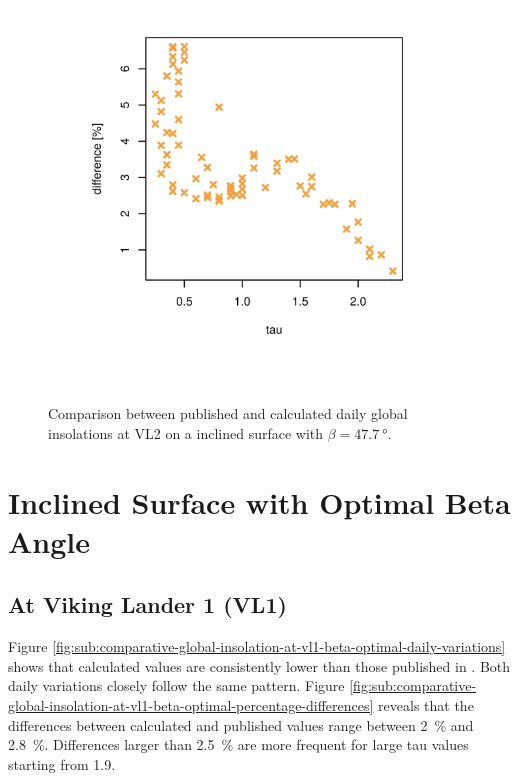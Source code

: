 \begin{figure}[H]
\begin{subfigure}[t]{\subfigureWidth}
            \includegraphics[height=\graphicsHeight]{sections/appendix/insolation-calculation-verification/plots/h-diff-bet-exp-calc-at-vl2-with-beta-477-deg.png}
            \label{fig:sub:comparative-global-insolation-at-vl2-beta-equals-phi-percentage-differences}
    \end{subfigure}\\[0.8ex]
    \caption{Comparison between published and calculated daily global insolations at \ac{VL2} on a inclined surface with $\beta=\SI{47.7}{\degree}$.}
    \label{fig:plot:comparative-global-insolation-at-vl2-beta-equals-phi}
\vspace{-2ex}
\end{figure}
\clearpage

\section{Inclined Surface with Optimal Beta Angle}
\subsection{At Viking Lander 1 (VL1)}
Figure \ref{fig:sub:comparative-global-insolation-at-vl1-beta-optimal-daily-variations} shows that calculated values are consistently lower than those published in . Both daily variations closely follow the same pattern. Figure \ref{fig:sub:comparative-global-insolation-at-vl1-beta-optimal-percentage-differences} reveals that the differences between calculated and published values range between \SI{2}{\percent} and \SI{2.8}{\percent}. Differences larger than \SI{2.5}{\percent} are more frequent for large tau values starting from 1.9.

